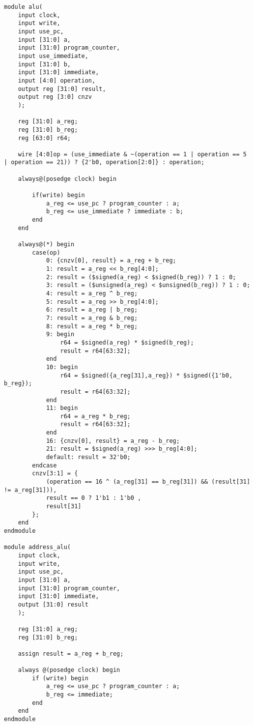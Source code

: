 \begin{lstlisting}
module alu(
    input clock,
    input write,
    input use_pc,
    input [31:0] a,
    input [31:0] program_counter,
    input use_immediate,
    input [31:0] b,
    input [31:0] immediate,
    input [4:0] operation,
    output reg [31:0] result,
    output reg [3:0] cnzv
    );
    
    reg [31:0] a_reg;
    reg [31:0] b_reg;
    reg [63:0] r64;
    
    wire [4:0]op = (use_immediate & ~(operation == 1 | operation == 5 | operation == 21)) ? {2'b0, operation[2:0]} : operation;
    
    always@(posedge clock) begin
        
        if(write) begin
            a_reg <= use_pc ? program_counter : a;
            b_reg <= use_immediate ? immediate : b;
        end
    end
    
    always@(*) begin
        case(op)
            0: {cnzv[0], result} = a_reg + b_reg;
            1: result = a_reg << b_reg[4:0];
            2: result = ($signed(a_reg) < $signed(b_reg)) ? 1 : 0;
            3: result = ($unsigned(a_reg) < $unsigned(b_reg)) ? 1 : 0;
            4: result = a_reg ^ b_reg;
            5: result = a_reg >> b_reg[4:0];
            6: result = a_reg | b_reg;
            7: result = a_reg & b_reg;
            8: result = a_reg * b_reg;
            9: begin
                r64 = $signed(a_reg) * $signed(b_reg); 
                result = r64[63:32];
            end
            10: begin 
                r64 = $signed({a_reg[31],a_reg}) * $signed({1'b0, b_reg});
                result = r64[63:32];
            end
            11: begin
                r64 = a_reg * b_reg;
                result = r64[63:32];
            end
            16: {cnzv[0], result} = a_reg - b_reg;
            21: result = $signed(a_reg) >>> b_reg[4:0];
            default: result = 32'b0;
        endcase
        cnzv[3:1] = {
            (operation == 16 ^ (a_reg[31] == b_reg[31]) && (result[31] != a_reg[31])), 
            result == 0 ? 1'b1 : 1'b0 , 
            result[31]
        };
    end
endmodule

module address_alu(
    input clock,
    input write,
    input use_pc,
    input [31:0] a,
    input [31:0] program_counter,
    input [31:0] immediate,
    output [31:0] result
    );
    
    reg [31:0] a_reg;
    reg [31:0] b_reg;
    
    assign result = a_reg + b_reg;

    always @(posedge clock) begin
        if (write) begin
            a_reg <= use_pc ? program_counter : a;
            b_reg <= immediate;
        end       
    end
endmodule


\end{lstlisting}
